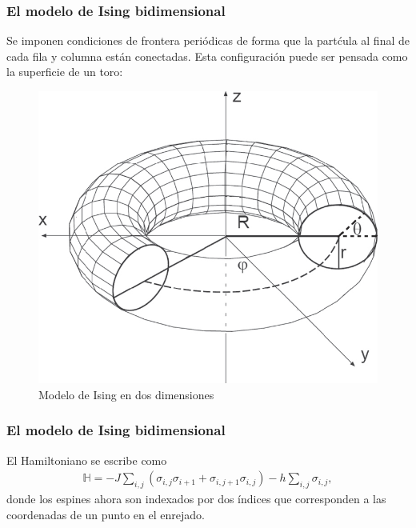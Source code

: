 \documentclass{beamer}
\begin{document}
\begin{frame}
\frametitle{El modelo de Ising bidimensional}
Se imponen condiciones de frontera periódicas de forma que la part\'cula al final de cada fila y columna están conectadas. Esta configuraci\'on puede ser pensada como la superficie de un toro: 
%
\begin{figure}
\centering
\includegraphics[scale=0.5]{fig/torus.png}
\caption{Modelo de Ising en dos dimensiones}
\end{figure}
\end{frame}

\begin{frame}
\frametitle{El modelo de Ising bidimensional}

El Hamiltoniano se escribe como 
\begin{eqnarray}
\mathbb{H}= -J \sum_{i,j} (\sigma_{i,j}\sigma_{i+1}+\sigma_{i,j+1}\sigma_{i,j}) - h \sum_{i,j}\sigma_{i,j},
\end{eqnarray}
donde los espines ahora son indexados por dos \'indices que corresponden a las coordenadas de un punto en el enrejado.

\end{frame}
\end{document}
